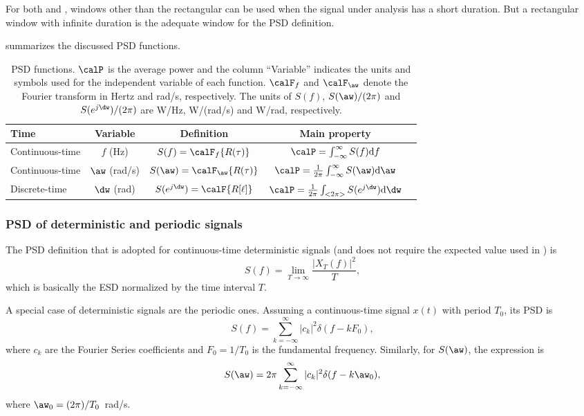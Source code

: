 For both  and , 
windows other than the rectangular can be used when the signal under analysis has a short duration. But a rectangular window
with infinite duration is the adequate window for the PSD definition.

 summarizes the discussed PSD functions.

\begin{table}
\centering
\caption{PSD functions. $\calP$ is the average power and the column ``Variable'' indicates the units and symbols used for the independent variable of each function.
$\calF_f$ and $\calF_{\aw}$ denote the Fourier transform in Hertz and rad/s, respectively.
The units of $S(f)$, $S(\aw)/(2 \pi)$ and $S(e^{j\dw})/(2 \pi)$ are W/Hz, W/(rad/s) and W/rad, respectively.\label{tab:psd_functions}}
\begin{tabular}{|l|c|c|c|c|}
\hline
Time & Variable & Definition & Main property \\ \hline
Continuous-time & $f$ (Hz) & $S(f) = \calF_f \{ R(\tau) \}$ & $\calP = \int_{- \infty}^\infty S(f) \textrm{d}f$  \\ \hline
Continuous-time & $\aw$ (rad/s) & $S(\aw) = \calF_{\aw} \{ R(\tau) \}$ & $\calP = \frac{1}{2\pi} \int_{- \infty}^\infty S(\aw) \textrm{d}\aw$  \\ \hline
Discrete-time & $\dw$ (rad) & $S(e^{j \dw}) = \calF \{ R[\ell] \}$ & $\calP = \frac{1}{2 \pi}\int_{<2 \pi>} S(e^{j \dw}) \textrm{d}\dw$  \\ \hline
\end{tabular}
\end{table}

\subsubsection{PSD of deterministic and periodic signals}
\label{sec:psdPeriodicSignals}

The PSD definition that is adopted for continuous-time deterministic signals (and does not require the expected value used in ) is
\[
S(f) = \lim_{T \rightarrow \infty} \frac{|X_T(f)|^2}{T},
\]
which is basically the ESD normalized by the time interval $T$.

A special case of deterministic signals are the periodic ones.
Assuming a continuous-time signal $x(t)$ with period $T_0$, its PSD is
\begin{equation}
S(f) = \sum_{k=-\infty}^{\infty} |c_k|^2 \delta(f - k F_0),
\label{eq:psdOfPeriodicSignals}
\end{equation}
where $c_k$ are the Fourier Series coefficients and $F_0=1/T_0$ is the fundamental frequency.
Similarly, for $S(\aw)$, the expression is
\begin{equation}
S(\aw) = 2 \pi \sum_{k=-\infty}^{\infty} |c_k|^2 \delta(f - k \aw_0),
\end{equation}
where $\aw_0 = (2 \pi) / T_0$~rad/s.

